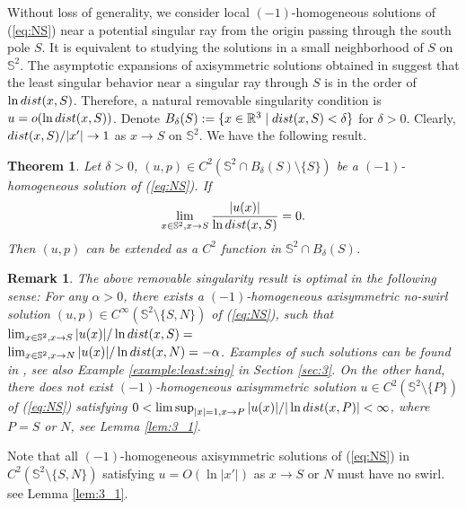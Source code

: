 \documentclass[12pt]{article}
\newtheorem{thm}{Theorem}[section]
\newtheorem{rmk}{Remark}[section]
\newcommand{\bS}{\mathbb{S}}
\begin{document}
Without loss of generality, we consider local $(-1)$-homogeneous solutions of (\ref{eq:NS}) near a potential singular ray from the origin passing through the south pole $S$. It is equivalent to studying the solutions in a small neighborhood of $S$ on $\mathbb{S}^2$. The asymptotic expansions of axisymmetric solutions obtained in \cite{LLY1} suggest that the least singular behavior near a singular ray through $S$ is in the order of $\ln {\rm dist}(x,S)$. Therefore, a natural removable singularity condition is $u=o(\ln {\rm dist}(x,S))$. Denote $B_{\delta}(S) := \{ x \in \mathbb{R}^3 \mid {\rm dist}(x,S)<\delta\}$ for $\delta>0$. Clearly, ${\rm dist}(x,S)/|x'|\to 1$ as $x\to S$ on $\bS^2$. We have the following result.  

\begin{thm}\label{thm_main}
	Let $\delta>0$, 
	$(u, p)\in C^{2}(\mathbb{S}^2\cap B_{\delta}(S)\setminus\{S\})$ be a $(-1)$-homogeneous solution of (\ref{eq:NS}). If 
	\begin{equation}\label{eq:thm:main}
		\lim_{x\in \mathbb{S}^2, x\to S}\frac{|u(x)|}{\ln {\rm dist}(x,S)}=0. %
	\end{equation}
	 Then $(u, p)$ can be extended as a $C^2$ function in $\mathbb{S}^2\cap B_{\delta}(S)$. 
\end{thm}

\begin{rmk}
	The above removable singularity result is optimal in the following sense: For any $\alpha>0$, there exists a $(-1)$-homogeneous axisymmetric no-swirl solution $(u, p)\in C^{\infty}(\mathbb{S}^2\setminus\{S, N\})$ of (\ref{eq:NS}), such that $\lim_{x\in \mathbb{S}^2, x\to S}|u(x)|/\ln {\rm dist}(x, S)=$\\$\lim_{x\in \mathbb{S}^2, x\to N}|u(x)|/\ln {\rm dist}(x, N) = - \alpha$.
	Examples of such solutions can be found in \cite{LLY2}, see also Example \ref{example:least:sing} in Section \ref{sec:3}. 
	On the other hand, %
	there does not exist $(-1)$-homogeneous axisymmetric solution $u\in C^2(\mathbb{S}^2\setminus\{P\})$ of (\ref{eq:NS}) satisfying $0<\limsup_{|x|=1,x\to P}|u(x)|/|\ln {\rm dist}(x, P)|<\infty$, where $P=S$ or $N$, see Lemma \ref{lem:3_1}. 
\end{rmk}

Note that all $(-1)$-homogeneous axisymmetric solutions of (\ref{eq:NS}) in $C^{2}(\bS^2\setminus\{S, N\})$ satisfying $u=O(\ln |x'|)$ as $x\to S$ or $N$ must have no swirl. see Lemma \ref{lem:3_1}. 
\end{document}
